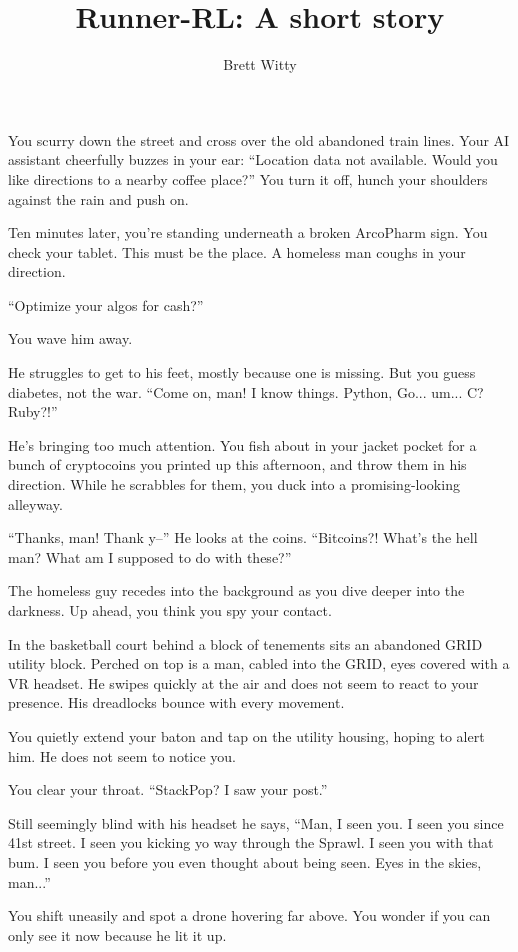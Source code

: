 \documentclass[ebook,11pt,oneside,openany]{memoir}
\title{Runner-RL: A short story}
\author{Brett Witty}
\newcommand{\scenechange}{
  \par
  \vspace{\baselineskip}
  \par
\noindent}
\begin{document}
\maketitle

You scurry down the street and cross over the old abandoned train lines. Your AI assistant cheerfully buzzes in your ear: ``Location data not available. Would you like directions to a nearby coffee place?'' You turn it off, hunch your shoulders against the rain and push on.

\scenechange

Ten minutes later, you're standing underneath a broken ArcoPharm sign. You check your tablet. This must be the place. A homeless man coughs in your direction.

``Optimize your algos for cash?''

You wave him away.

He struggles to get to his feet, mostly because one is missing. But you guess diabetes, not the war. ``Come on, man! I know things. Python, Go... um... C? Ruby?!''

He's bringing too much attention. You fish about in your jacket pocket for a bunch of cryptocoins you printed up this afternoon, and throw them in his direction. While he scrabbles for them, you duck into a promising-looking alleyway.

``Thanks, man! Thank y--'' He looks at the coins. ``Bitcoins?! What's the hell man? What am I supposed to do with these?''

The homeless guy recedes into the background as you dive deeper into the darkness. Up ahead, you think you spy your contact.

In the basketball court behind a block of tenements sits an abandoned GRID utility block. Perched on top is a man, cabled into the GRID, eyes covered with a VR headset. He swipes quickly at the air and does not seem to react to your presence. His dreadlocks bounce with every movement.

You quietly extend your baton and tap on the utility housing, hoping to alert him. He does not seem to notice you.

You clear your throat. ``StackPop? I saw your post.''

Still seemingly blind with his headset he says, ``Man, I seen you. I seen you since 41st street. I seen you kicking yo way through the Sprawl. I seen you with that bum. I seen you before you even thought about being seen. Eyes in the skies, man...''

You shift uneasily and spot a drone hovering far above. You wonder if you can only see it now because he lit it up.
\end{document}
